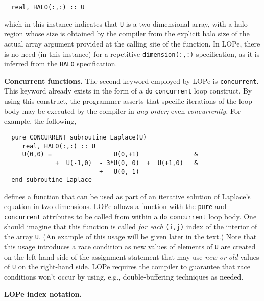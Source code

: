 \begin{verbatim}
  real, HALO(:,:) :: U
\end{verbatim}

which in this instance indicates that \texttt{U} is a two-dimensional
array, with a halo region whose size is obtained by the compiler from
the explicit halo size of the actual array argument provided at the
calling site of the function.  In LOPe, there is no need (in this
instance) for a repetitive \texttt{dimension(:,:)} specification, as
it is inferred from the \texttt{HALO} specification.

\textbf{Concurrent functions.}
The second keyword employed by LOPe is \texttt{concurrent}.  This keyword already exists in the form
of a \texttt{do} \texttt{concurrent} loop construct.  By using this construct, the programmer
asserts that specific iterations of the loop body may be executed by the compiler in \emph{any
  order;} even \emph{concurrently.}
For example, the following,
\begin{verbatim}
  pure CONCURRENT subroutine Laplace(U)
     real, HALO(:,:) :: U
     U(0,0) =                 U(0,+1)               &
              +  U(-1,0)  - 3*U(0, 0)  +  U(+1,0)   &
                          +   U(0,-1)
  end subroutine Laplace
\end{verbatim}

defines a function that can be used as part of an iterative solution
of Laplace's equation in two dimensions.  LOPe allows a function with
the \texttt{pure} and \texttt{concurrent} attributes to be called from
within a \texttt{do} \texttt{concurrent} loop body.  One should
imagine that this function is called \emph{for each} \texttt{(i,j)}
index of the interior of the array \texttt{U}.  (An example of this
usage will be given later in the text.)  Note that this usage
introduces a race condition as new values of elements of \texttt{U}
are created on the left-hand side of the assignment statement that may
use \emph{new or old} values of \texttt{U} on the right-hand side.
LOPe requires the compiler to guarantee that race conditions won't
occur by using, e.g., double-buffering techniques as needed.

\textbf{LOPe index notation.}

